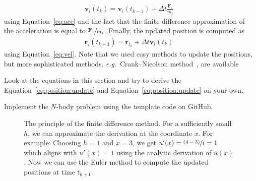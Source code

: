 \begin{align}
\mathbf{v}_i(t_k) = \mathbf{v}_i(t_{k-1}) + \Delta t \frac{\mathbf{F}_i}{m_i} \label{eq:position:update}
\end{align}
using Equation~\eqref{eq:acc} and the fact that the finite difference approximation of the acceleration is equal to $\sfrac{\mathbf{F}_i}{m_i}$. Finally, the updated position is computed as
\begin{align}
\mathbf{r}_i(t_{k+1}) = \mathbf{r}_{t_k} + \Delta t \mathbf{v}_i(t_k)  \label{eq:position:update2}
\end{align} 
using Equation~\eqref{eq:vel}. Note that we used easy methods to update the positions, but more sophisticated methods, \emph{e.g.}\ Crank--Nicolson method~\cite{crank1947practical}, are available

\begin{exercise}
Look at the equations in this section and try to derive the Equation~\ref{eq:position:update} and Equation~\ref{eq:position:update} on your own.
\end{exercise}

\begin{exercise}
Implement the $N$-body problem using the template code on GitHub.
\end{exercise}

\begin{figure}[tb]
\centering
{}
\caption{The principle of the finite difference method. For a sufficiently small $h$, we can approximate the derivation at the coordinate $x$. For example: Choosing $h=1$ and $x=3$, we get $u'(x)=\sfrac{(4-3)}{1}=1$ which aligns with $u'(x)=1$ using the analytic derivation of $u(x)$. Now we can use the Euler method to compute the updated positions at time $t_{k+1}$.}
\label{fig:nbody:finitedifference}
\end{figure}

